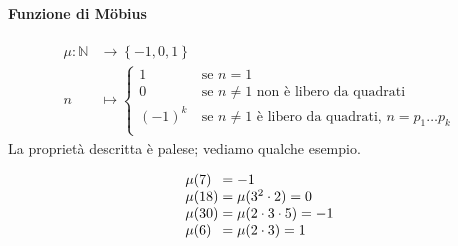 \paragraph{Funzione di M\"obius}
\begin{align*}
\mu: \mathbb{N}&\longrightarrow \left\{-1,0,1\right\}\\
n &\longmapsto 
\begin{cases}
1 \  & \text{se $n=1$}\\
0 \  & \text{se $n\neq1$ non è libero da quadrati}\\
(-1)^k \  & \text{se $n\neq1$ è libero da quadrati, $n=p_1\dots p_k$}\\
\end{cases}
\end{align*}
La proprietà descritta è palese; vediamo qualche esempio.
\begin{esempio}
	\begin{equation*}
	\arraycolsep=1.4pt
	\begin{array}{ll}
		\mu(7)&=-1	\\ 
		\mu(18)&=\mu(3^2\cdot2)=0\\
		\mu(30)& =\mu(2\cdot3\cdot5)=-1\\
		\mu(6) &=\mu(2\cdot3)=1
	\end{array}
	\end{equation*}
\end{esempio}
